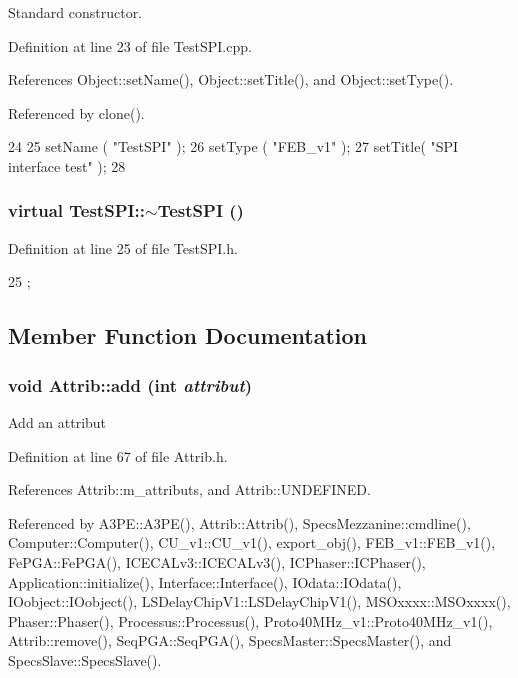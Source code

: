 Standard constructor. 

Definition at line 23 of file TestSPI.cpp.

References Object::setName(), Object::setTitle(), and Object::setType().

Referenced by clone().


\begin{DoxyCode}
24 {
25   setName ( "TestSPI" );
26   setType ( "FEB_v1" );
27   setTitle( "SPI interface test" );  
28 }
\end{DoxyCode}
\hypertarget{classTestSPI_af557282f685f8dcfb34fcc846bf91bce}{
\subsubsection[{$\sim$TestSPI}]{\setlength{\rightskip}{0pt plus 5cm}virtual TestSPI::$\sim$TestSPI ()}}
\label{classTestSPI_af557282f685f8dcfb34fcc846bf91bce}


Definition at line 25 of file TestSPI.h.


\begin{DoxyCode}
25 {}; 
\end{DoxyCode}


\subsection{Member Function Documentation}
\hypertarget{classAttrib_a235f773af19c900264a190b00a3b4ad7}{
\subsubsection[{add}]{\setlength{\rightskip}{0pt plus 5cm}void Attrib::add (int {\em attribut})}}
\label{classAttrib_a235f773af19c900264a190b00a3b4ad7}
Add an attribut 

Definition at line 67 of file Attrib.h.

References Attrib::m\_\-attributs, and Attrib::UNDEFINED.

Referenced by A3PE::A3PE(), Attrib::Attrib(), SpecsMezzanine::cmdline(), Computer::Computer(), CU\_\-v1::CU\_\-v1(), export\_\-obj(), FEB\_\-v1::FEB\_\-v1(), FePGA::FePGA(), ICECALv3::ICECALv3(), ICPhaser::ICPhaser(), Application::initialize(), Interface::Interface(), IOdata::IOdata(), IOobject::IOobject(), LSDelayChipV1::LSDelayChipV1(), MSOxxxx::MSOxxxx(), Phaser::Phaser(), Processus::Processus(), Proto40MHz\_\-v1::Proto40MHz\_\-v1(), Attrib::remove(), SeqPGA::SeqPGA(), SpecsMaster::SpecsMaster(), and SpecsSlave::SpecsSlave().


